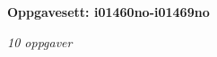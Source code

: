 \centerline{\bf Oppgavesett: i01460no-i01469no}
\vskip 10pt
\centerline{\it 10 oppgaver}\vskip 10pt
\vskip 10pt
